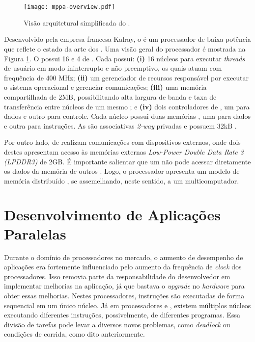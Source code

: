 \section{\mppa}
\label{sec:mppa256}

\begin{figure}[tb]
  \centering
  \caption{Visão arquitetural simplificada do \mppa.}
  \label{fig:mppa256overview}
  \texttt{[image: mppa-overview.pdf]}
\end{figure}

Desenvolvido pela empresa francesa Kalray, o \mppa é um processador de baixa potência que reflete o estado da arte dos \manycores \cite{mppa2562013}. Uma visão geral do processador é mostrada na Figura \ref{fig:mppa256overview}. O \mppa possui 16 \CCs e 4 \clusters de \IO. Cada \CC possui: \textbf{(i)} 16 núcleos para executar \textit{threads} de usuário em modo ininterrupto e não preemptivo, os quais atuam com frequência de 400 MHz; \textbf{(ii)} um gerenciador de recursos responsável por executar
o sistema operacional e gerenciar comunicações; \textbf{(iii)} uma memória compartilhada de 2MB, possibilitando alta largura de banda e taxa de transferência entre núcleos de um mesmo \cluster; e \textbf{(iv)} dois controladores de \textit{\NoC}, um para dados e outro para controle. Cada núcleo possui duas memórias \cache, uma para dados e outra para instruções. As \caches são associativas \textit{2-way} privadas e possuem 32kB \cite{Podesta2018Stencil}.

Por outro lado, \clusters de \IO realizam comunicações com dispositivos externos, onde dois destes apresentam acesso às memórias externas \textit{Low-Power Double Data Rate 3 (LPDDR3)} de 2GB. É importante salientar que um \CC não pode acessar diretamente os dados da memória de outros \clusters. Logo, o processador apresenta um modelo de memória distribuído \cite{Castro-Souza-CCPE:2016, Podesta2018Stencil}, se assemelhando, neste sentido, a um multicomputador.

\section{Desenvolvimento de Aplicações Paralelas}
\label{sec:bibliotecasdevparalelo}

Durante o domínio de processadores \singlecore no mercado, o aumento de desempenho de aplicações era fortemente influenciado pelo aumento da frequência de \textit{clock} dos processadores. Isso removia parte da responsabilidade do desenvolvedor em implementar melhorias na aplicação, já que bastava o \textit{upgrade} no \textit{hardware} para obter essas melhorias. Nestes processadores, instruções são executadas de forma sequencial em um único núcleo. Já em processadores \multicore e \manycore, existem múltiplos núcleos executando diferentes instruções, possivelmente, de diferentes programas. Essa divisão de tarefas pode levar a diversos novos problemas, como \textit{deadlock} ou condições de corrida, como dito anteriormente.

